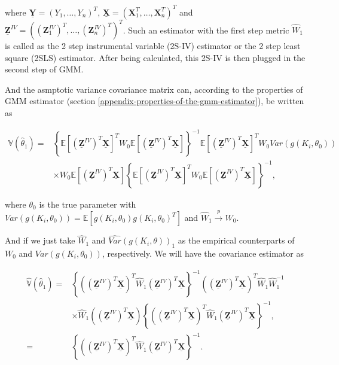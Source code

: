 \documentclass[
  12pt,
]{article}
\begin{document}
where \(\mathbf{\underline{Y}} = (Y_1, \dots, Y_n)^T\), \(\mathbf{\underline{X}} = (\mathbf{X}_{1}^T, \dots, \mathbf{X}_{n}^T)^T\) and \(\mathbf{\underline{Z}}^{IV} = ((\mathbf{Z}_{1}^{IV})^T, \dots, (\mathbf{Z}_{n}^{IV})^T)^T\). Such an estimator with the first step metric \(\widehat{W}_1\) is called as the \color{blue} 2 step instrumental variable \color{black} (2S-IV) estimator or the \color{blue} 2 step least square \color{black} (2SLS) estimator. After being calculated, this 2S-IV is then plugged in the second step of GMM.

And the asmptotic variance covariance matrix can, according to the properties of GMM estimator (section \ref{appendix-properties-of-the-gmm-estimator}), be written as

\begin{align*}
    \mathbb{V}(\hat{\theta}_1) = 
    & \left\{ \mathbb{E}\left[ (\mathbf{\underline{Z}}^{IV})^T \mathbf{\underline{X}} \right]^T W_0 \mathbb{E}\left[ (\mathbf{\underline{Z}}^{IV})^T \mathbf{\underline{X}}\right] \right\}^{-1} \mathbb{E}\left[ (\mathbf{\underline{Z}}^{IV})^T \mathbf{\underline{X}} \right]^T W_0 Var\left( g(K_i, \theta_0)\right)\\
    & \times W_0 \mathbb{E}\left[ (\mathbf{\underline{Z}}^{IV})^T \mathbf{\underline{X}} \right] \left\{ \mathbb{E}\left[ (\mathbf{\underline{Z}}^{IV})^T \mathbf{\underline{X}} \right]^T W_0 \mathbb{E}\left[ (\mathbf{\underline{Z}}^{IV})^T \mathbf{\underline{X}} \right] \right\}^{-1},
\end{align*}

where \(\theta_0\) is the true parameter with \(Var\left( g(K_i, \theta_0)\right) = \mathbb{E}\left[g(K_i, \theta_0)g(K_i, \theta_0)^T \right]\) and \(\widehat{W}_1 \stackrel{p}{\to} W_0\).

And if we just take \(\widehat{W}_1\) and \(\widehat{Var}(g(K_i, \theta))_1\) as the empirical counterparts of \(W_0\) and \(Var\left( g(K_i, \theta_0)\right)\), respectively. We will have the covariance estimator as

\begin{align*}
    \widehat{\mathbb{V}}(\hat{\theta}_1) = 
    & \left\{\left((\mathbf{\underline{Z}}^{IV})^T \mathbf{\underline{X}} \right)^T \widehat{W}_1 (\mathbf{\underline{Z}}^{IV})^T \mathbf{\underline{X}} \right\}^{-1} \left((\mathbf{\underline{Z}}^{IV})^T \mathbf{\underline{X}} \right)^T \widehat{W}_1 \widehat{W}_1^{-1}\\
    & \times \widehat{W}_1 \left((\mathbf{\underline{Z}}^{IV})^T \mathbf{\underline{X}} \right) \left\{\left((\mathbf{\underline{Z}}^{IV})^T \mathbf{\underline{X}} \right)^T \widehat{W}_1 (\mathbf{\underline{Z}}^{IV})^T \mathbf{\underline{X}} \right\}^{-1},\\
    = & \left\{\left((\mathbf{\underline{Z}}^{IV})^T \mathbf{\underline{X}} \right)^T \widehat{W}_1 (\mathbf{\underline{Z}}^{IV})^T \mathbf{\underline{X}} \right\}^{-1}.
\end{align*}
\end{document}

